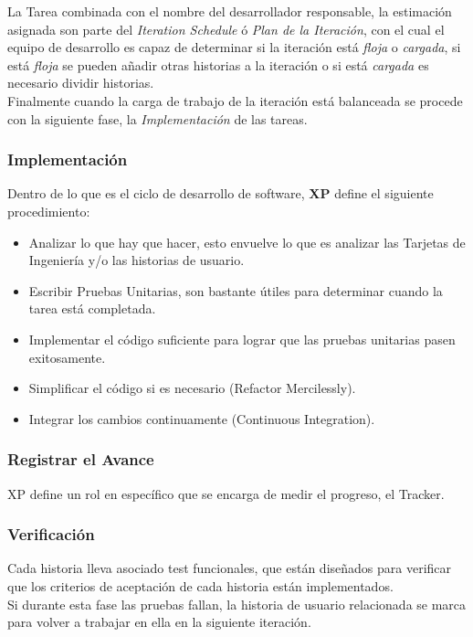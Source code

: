             La Tarea combinada con el nombre del desarrollador responsable, la estimación asignada son parte del \emph{Iteration Schedule} \'o \emph{Plan de la Iteración}, con el cual el equipo de desarrollo es capaz de determinar si la iteración está \emph{floja} o \emph{cargada}, si está \emph{floja} se pueden añadir otras historias a la iteración o si está \emph{cargada} es necesario dividir historias.\\
            Finalmente cuando la carga de trabajo de la iteración está balanceada se procede con la siguiente fase, la \emph{Implementación} de las tareas.



            \subsubsection{Implementación}
            \label{subs:implementacion}

            Dentro de lo que es el ciclo de desarrollo de software, \textbf{XP} define el siguiente procedimiento:

            \begin{itemize}
              \item Analizar lo que hay que hacer, esto envuelve lo que es analizar las Tarjetas de Ingeniería y/o las historias de usuario. %
              \item Escribir Pruebas Unitarias, son bastante útiles para determinar cuando la tarea está completada.
              \item Implementar el código suficiente para lograr que las pruebas unitarias pasen exitosamente.
              \item Simplificar el código si es necesario (Refactor Mercilessly).
              \item Integrar los cambios continuamente (Continuous Integration).
            \end{itemize}

            \subsubsection{Registrar el Avance}
            \label{subs:registrar_avance}
            XP define un rol en específico que se encarga de medir el progreso, el Tracker.

            \subsubsection{Verificación}
            \label{subs:verificacion}
            Cada historia lleva asociado test funcionales, que están diseñados para verificar que los criterios de aceptación de cada historia están implementados. \\
            Si durante esta fase las pruebas fallan, la historia de usuario relacionada se marca para volver a trabajar en ella en la siguiente iteración.\\


